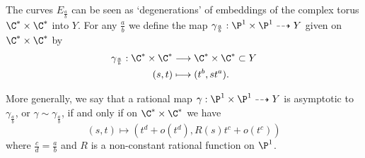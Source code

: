 \documentclass[11pt, final]{amsart}
\newcommand{\dashto}{\dashrightarrow}
\newcommand{\lo}{o}
\begin{document}
The curves $E_{\frac ab}$ can be seen as `degenerations' of embeddings of the complex torus $\C^*\times \C^*$ into $Y$. For any $\frac ab$ we define the map $\gamma_{\frac ab} : \P^1 \times \P^1 \dashto Y$ given on $\C^*\times \C^*$ by
\begin{align*}
 \gamma_{\frac ab} : \C^*\times \C^* &\longrightarrow \C^*\times \C^* \subset Y\\
 (s, t) &\longmapsto (t^b, st^a).
\end{align*}

More generally, we say that a rational map $\gamma : \P^1 \times \P^1 \dashto Y$ is asymptotic to $\gamma_{\frac ab}$, or $\gamma \sim \gamma_{\frac ab}$, if and only if on $\C^* \times \C^*$ we have
 \[(s, t) \longmapsto (t^d + \lo(t^d), R(s)t^c + \lo(t^c))\]
where $\frac cd = \frac ab$ and $R$ is a non-constant rational function on $\P^1$.


\end{document}
